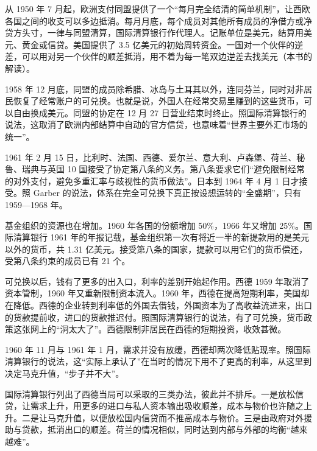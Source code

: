 从 1950 年 7 月起，欧洲支付同盟提供了一个“每月完全结清的简单机制”，让西欧各国之间的收支可以多边抵消\cite{bis36}。每月月底，每个成员对其他所有成员的净借方或净贷方头寸，一律与同盟清算，国际清算银行作代理人\cite{bordo1993}。记账单位是美元，结算用美元、黄金或信贷\cite{bordo1993}。美国提供了 3.5 亿美元的初始周转资金\cite{bordo1993}。一国对一个伙伴的逆差，可以用对另一个伙伴的顺差抵消，用不着为每一笔双边逆差去找美元（本书的解读）。

1958 年 12 月底，同盟的成员除希腊、冰岛与土耳其以外，连同芬兰，同时对非居民恢复了经常账户的可兑换\cite{bis36}。也就是说，外国人在经常交易里赚到的这些货币，可以自由换成美元。同盟的协定在 12 月 27 日营业结束时终止\cite{bis36}。照国际清算银行的说法，这取消了欧洲内部结算中自动的官方信贷，也意味着“世界主要外汇市场的统一”\cite{bis36}。

1961 年 2 月 15 日，比利时、法国、西德、爱尔兰、意大利、卢森堡、荷兰、秘鲁、瑞典与英国 10 国接受了协定第八条的义务\cite{bis36,bordo1993}。第八条要求它们“避免限制经常的对外支付，避免多重汇率与歧视性的货币做法”\cite{bis36}。日本到 1964 年 4 月 1 日才接受\cite{bordo1993}。照 Garber 的说法，体系在完全可兑换下真正按设想运转的“全盛期”，只有 1959—1968 年\cite{garber1993}。

基金组织的资源也在增加。1960 年各国的份额增加 50\%，1966 年又增加 25\%\cite{bordo1993}。国际清算银行 1961 年的年报记载，基金组织第一次有将近一半的新提款用的是美元以外的货币，共 1.31 亿美元\cite{bis36}。接受第八条的国家，提款可以用它们的货币偿还，受第八条约束的成员已有 21 个\cite{bis36}。

可兑换以后，钱有了更多的出入口，利率的差别开始起作用。西德 1959 年取消了资本管制，1960 年又重新限制资本流入\cite{bordo1993}。1960 年，西德在提高短期利率，美国却在降低\cite{bis36}。西德的企业转到利率低的外国去借钱，外国资本为了高收益流进来，出口的货款提前收，进口的货款推迟付\cite{bis36}。照国际清算银行的说法，有了可兑换，货币政策这张网上的“洞太大了”\cite{bis36}。西德限制非居民在西德的短期投资，收效甚微\cite{bis36}。

1960 年 11 月与 1961 年 1 月，需求并没有放缓，西德却两次降低贴现率\cite{bis36}。照国际清算银行的说法，这“实际上承认了”在当时的情况下用不了更高的利率，从这里到决定马克升值，“步子并不大”\cite{bis36}。

国际清算银行列出了西德当局可以采取的三类办法，彼此并不排斥\cite{bis36}。一是放松信贷，让需求上升，用更多的进口与私人资本输出吸收顺差，成本与物价也许随之上升。二是让马克升值，以便放松国内信贷而不推高成本与物价。三是由政府对外援助与贷款，抵消出口的顺差\cite{bis36}。荷兰的情况相似，同时达到内部与外部的均衡“越来越难”\cite{bis36}。

